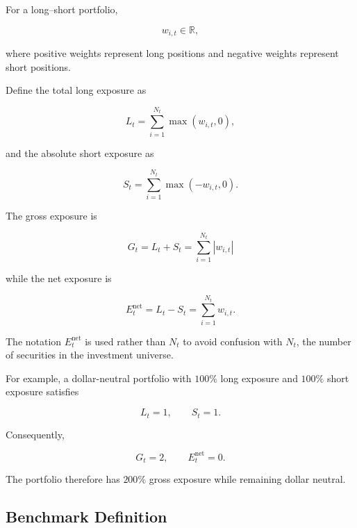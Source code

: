 \documentclass[11pt,a4paper]{article}
\begin{document}
For a long--short portfolio,

\begin{equation}
w_{i,t}
\in
\mathbb{R},
\end{equation}

where positive weights represent long positions and negative weights represent
short positions.

Define the total long exposure as

\begin{equation}
L_t
=
\sum_{i=1}^{N_t}
\max(w_{i,t},0),
\end{equation}

and the absolute short exposure as

\begin{equation}
S_t
=
\sum_{i=1}^{N_t}
\max(-w_{i,t},0).
\end{equation}

The gross exposure is

\begin{equation}
\boxed{
G_t
=
L_t+S_t
=
\sum_{i=1}^{N_t}
|w_{i,t}|
}
\end{equation}

while the net exposure is

\begin{equation}
\boxed{
E_t^{\mathrm{net}}
=
L_t-S_t
=
\sum_{i=1}^{N_t}
w_{i,t}.
}
\end{equation}

The notation $E_t^{\mathrm{net}}$ is used rather than $N_t$ to avoid confusion
with $N_t$, the number of securities in the investment universe.

For example, a dollar-neutral portfolio with $100\%$ long exposure and
$100\%$ short exposure satisfies

\begin{equation}
L_t=1,
\qquad
S_t=1.
\end{equation}

Consequently,

\begin{equation}
G_t=2,
\qquad
E_t^{\mathrm{net}}=0.
\end{equation}

The portfolio therefore has $200\%$ gross exposure while remaining dollar
neutral.


\subsection{Benchmark Definition}
\label{subsec:benchmark}
\end{document}
